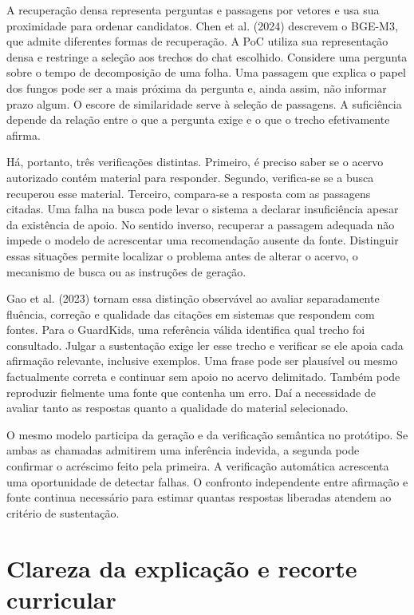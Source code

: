 A recuperação densa representa perguntas e passagens por vetores e usa sua proximidade para ordenar candidatos. Chen et al. (2024) descrevem o BGE-M3, que admite diferentes formas de recuperação. A PoC utiliza sua representação densa e restringe a seleção aos trechos do chat escolhido. Considere uma pergunta sobre o tempo de decomposição de uma folha. Uma passagem que explica o papel dos fungos pode ser a mais próxima da pergunta e, ainda assim, não informar prazo algum. O escore de similaridade serve à seleção de passagens. A suficiência depende da relação entre o que a pergunta exige e o que o trecho efetivamente afirma.

Há, portanto, três verificações distintas. Primeiro, é preciso saber se o acervo autorizado contém material para responder. Segundo, verifica-se se a busca recuperou esse material. Terceiro, compara-se a resposta com as passagens citadas. Uma falha na busca pode levar o sistema a declarar insuficiência apesar da existência de apoio. No sentido inverso, recuperar a passagem adequada não impede o modelo de acrescentar uma recomendação ausente da fonte. Distinguir essas situações permite localizar o problema antes de alterar o acervo, o mecanismo de busca ou as instruções de geração.

Gao et al. (2023) tornam essa distinção observável ao avaliar separadamente fluência, correção e qualidade das citações em sistemas que respondem com fontes. Para o GuardKids, uma referência válida identifica qual trecho foi consultado. Julgar a sustentação exige ler esse trecho e verificar se ele apoia cada afirmação relevante, inclusive exemplos. Uma frase pode ser plausível ou mesmo factualmente correta e continuar sem apoio no acervo delimitado. Também pode reproduzir fielmente uma fonte que contenha um erro. Daí a necessidade de avaliar tanto as respostas quanto a qualidade do material selecionado.

O mesmo modelo participa da geração e da verificação semântica no protótipo. Se ambas as chamadas admitirem uma inferência indevida, a segunda pode confirmar o acréscimo feito pela primeira. A verificação automática acrescenta uma oportunidade de detectar falhas. O confronto independente entre afirmação e fonte continua necessário para estimar quantas respostas liberadas atendem ao critério de sustentação.

\section{Clareza da explicação e recorte curricular}

